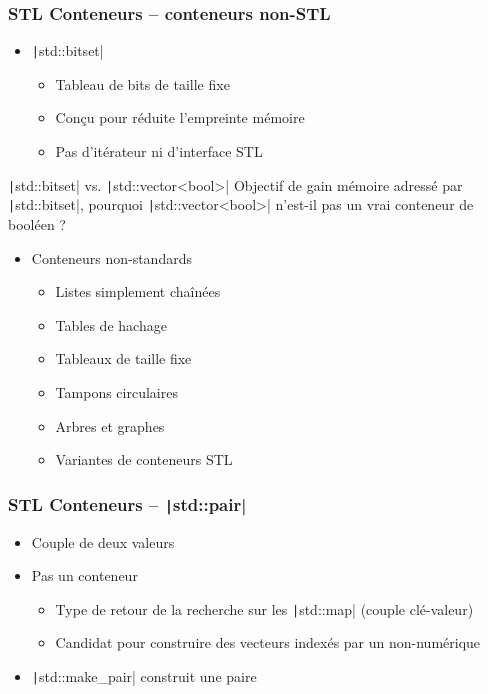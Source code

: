 \documentclass[C++.tex]{subfiles}
\begin{document}
\begin{frame}[fragile]
	\frametitle{STL Conteneurs -- conteneurs non-STL}


	\begin{itemize}
		\item \texttt|std::bitset|
		\begin{itemize}
			\item Tableau de bits de taille fixe
			\item Conçu pour réduite l'empreinte mémoire
			\item Pas d'itérateur ni d'interface STL
		\end{itemize}
	\end{itemize}

	\begin{block}{\texttt|std::bitset| vs. \texttt|std::vector<bool>|}
		Objectif de gain mémoire adressé par \texttt|std::bitset|, pourquoi \texttt|std::vector<bool>| n'est-il pas un vrai conteneur de booléen ?
	\end{block}

	\begin{itemize}
		\item Conteneurs non-standards
		\begin{itemize}
			\item Listes simplement chaînées
			\item Tables de hachage
			\item Tableaux de taille fixe
			\item Tampons circulaires
			\item Arbres et graphes
			\item Variantes de conteneurs STL

		\end{itemize}
	\end{itemize}
\end{frame}

\begin{frame}[fragile]
	\frametitle{STL Conteneurs -- \texttt|std::pair|}
	\begin{itemize}
		\item Couple de deux valeurs
		\item Pas un conteneur
		\begin{itemize}
			\item Type de retour de la recherche sur les \texttt|std::map| (couple clé-valeur)
			\item Candidat pour construire des vecteurs indexés par un non-numérique
		\end{itemize}
		\item \texttt|std::make_pair| construit une paire
	\end{itemize}
\end{frame}
\end{document}
